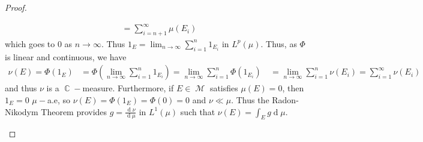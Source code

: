 \documentclass[11pt, a4paper]{memoir}
\DeclareMathOperator{\C}{{\mathbb{C}}}
\theoremstyle{change}
\theoremstyle{plain}
\theoremstyle{nonumberplain}
\newtheorem{proof}{Proof}
\DeclareMathOperator{\M}{{\mathcal{M}}}
\renewcommand{\d}[1]{\ensuremath{\operatorname{d}\!{#1}}}
\numberwithin{equation}{section}
\begin{document}
\begin{proof}
\begin{enumerate}[r]
\begin{align*}
                                                    &= \sum_{i=n+1}^\infty\mu(E_i)
            \end{align*}
            which goes to $0$ as $n\to\infty$.
            Thus $1_E=\lim_{n\to\infty}\sum_{i=1}^n 1_{E_i}$ in $L^p(\mu)$.
            Thus, as $\Phi$ is linear and continuous, we have
            \begin{align*}
                \nu(E)=\Phi(1_E) &= \Phi\left(\lim_{n\to\infty}\sum_{i=1}^n 1_{E_i}\right)=\lim_{n\to\infty}\sum_{i=1}^n\Phi(1_{E_i})\
                                 &= \lim_{n\to\infty}\sum_{i=1}^n\nu(E_i)=\sum_{i=1}^\infty\nu(E_i)
            \end{align*}
            and thus $\nu$ is a $\C-$measure.
            Furthermore, if $E\in\M$ satisfies $\mu(E)=0$, then $1_E=0$ $\mu-$a.e, so $\nu(E)=\Phi(1_E)=\Phi(0)=0$ and $\nu\ll\mu$.
            Thus the Radon-Nikodym Theorem provides $g=\frac{\d{\nu}}{\d{\mu}}$ in $L^1(\mu)$ such that $\nu(E)=\int_E g\d{\mu}$.


\end{enumerate}
\end{proof}
\end{document}
